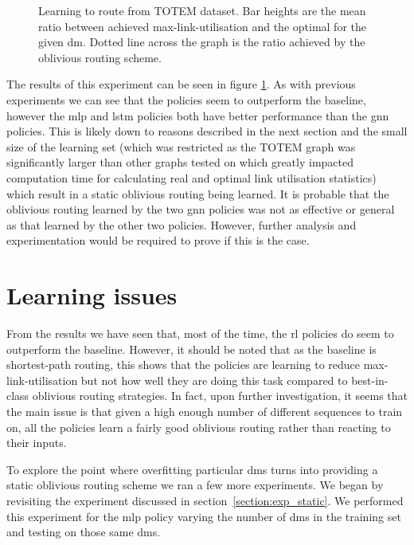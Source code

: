 \begin{figure}
    \centering
    
    \caption{Learning to route from TOTEM dataset. Bar heights are the mean ratio between achieved max-link-utilisation and the optimal for the given \ac{dm}. Dotted line across the graph is the ratio achieved by the oblivious routing scheme.}
    \label{fig:exp_real}
\end{figure}

The results of this experiment can be seen in figure \ref{fig:exp_real}. As with previous experiments we can see that the policies seem to outperform the baseline, however the \ac{mlp} and \ac{lstm} policies both have better performance than the \ac{gnn} policies. This is likely down to reasons described in the next section and the small size of the learning set (which was restricted as the TOTEM graph was significantly larger than other graphs tested on which greatly impacted computation time for calculating real and optimal link utilisation statistics) which result in a static oblivious routing being learned. It is probable that the oblivious routing learned by the two \ac{gnn} policies was not as effective or general as that learned by the other two policies. However, further analysis and experimentation would be required to prove if this is the case.


\section{Learning issues}
\label{section:overfit}
From the results we have seen that, most of the time, the \ac{rl} policies do seem to outperform the baseline. However, it should be noted that as the baseline is shortest-path routing, this shows that the policies are learning to reduce max-link-utilisation but not how well they are doing this task compared to best-in-class oblivious routing strategies. In fact, upon further investigation, it seems that the main issue is that given a high enough number of different sequences to train on, all the policies learn a fairly good oblivious routing rather than reacting to their inputs.

To explore the point where overfitting particular \acp{dm} turns into providing a static oblivious routing scheme we ran a few more experiments. We began by revisiting the experiment discussed in section~\ref{section:exp_static}. We performed this experiment for the \ac{mlp} policy varying the number of \acp{dm} in the training set and testing on those same \acp{dm}.

